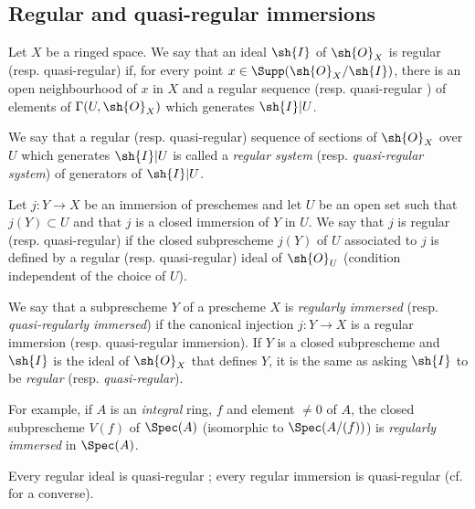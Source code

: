 \subsection{Regular and quasi-regular immersions}
\label{IV.16.9}

\begin{definition}[16.9.1]
\label{IV.16.9.1}
Let $X$ be a ringed space.
We say that an ideal $\sh{I}$ of $\sh{O}_X$ is regular (resp. quasi-regular) if, for every point $x \in \Supp(\sh{O}_X/\sh{I})$, there is an open neighbourhood of $x$ in $X$ and a regular sequence  (resp. quasi-regular ) of elements of $\Gamma(U, \sh{O}_X)$ which generates $\sh{I}|U$. 
\end{definition}

We say that a regular (resp. quasi-regular) sequence of sections of $\sh{O}_X$ over $U$ which generates $\sh{I}|U$ is called a \emph{regular system} (resp. \emph{quasi-regular system}) of generators of $\sh{I}|U$.

\begin{definition}[16.9.2]
\label{IV.16.9.2}
Let $j: Y \to X$ be an immersion of preschemes and let $U$ be an open set such that $j(Y) \subset U$ and that $j$ is a closed immersion of $Y$ in $U$.
We say that $j$ is regular (resp. quasi-regular) if the closed subprescheme $j(Y)$ of $U$ associated to $j$ is defined by a regular (resp. quasi-regular) ideal of $\sh{O}_U$ (condition independent of the choice of $U$).
\end{definition}

We say that a subprescheme $Y$ of a prescheme $X$ is \emph{regularly immersed} (resp. \emph{quasi-regularly immersed}) if the canonical injection $j:Y \to X$ is a regular immersion (resp. quasi-regular immersion). 
If $Y$ is a closed subprescheme and $\sh{I}$ is the ideal of $\sh{O}_X$ that defines $Y$, it is the same as asking $\sh{I}$ to be \emph{regular} (resp. \emph{quasi-regular}).

For example, if $A$ is an \emph{integral} ring, $f$ and element $\neq 0$ of $A$, the closed subprescheme $V(f)$ of $\Spec(A)$ (isomorphic to $\Spec(A/(f))$) is \emph{regularly immersed} in $\Spec(A)$.

Every regular ideal is quasi-regular ;
every regular immersion is quasi-regular (cf.  for a converse).  

